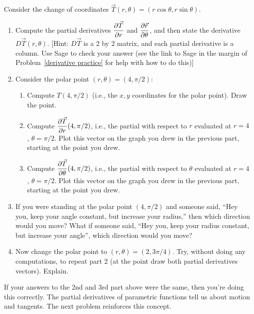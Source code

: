 \begin{problem}
 Consider the change of coordinates $\vec T(r,\theta) = (r\cos \theta, r\sin \theta)$.
\begin{enumerate}
 \item{}%
 Compute the partial derivatives $\displaystyle\frac{\partial \vec T}{\partial r}$ and $\displaystyle\frac{\partial \vec r}{\partial \theta}$, and then state the derivative $D\vec T(r,\theta)$. [Hint: $D\vec T$ is a 2 by 2 matrix, and each partial derivative is a column.  Use Sage to check your answer (see the link to Sage in the margin of Problem~\ref{derivative practice} for help with how to do this)]
 \item Consider the polar point $(r,\theta) = (4,\pi/2)$:
   \begin{enumerate}
   \item Compute $T(4,\pi/2)$ (i.e., the $x,y$ coordinates for the polar point).  Draw the point.
   \item Compute $\displaystyle \frac{\partial \vec T}{\partial r}(4,\pi/2)$, i.e., the partial with respect to $r$ evaluated at $r=4$, $\theta=\pi/2$.  Plot this vector on the graph you drew in the previous part, starting at the point you drew.
   \item Compute $\displaystyle \frac{\partial \vec T}{\partial \theta}(4,\pi/2)$, i.e., the partial with respect to $\theta$ evaluated at $r=4$, $\theta=\pi/2$.  Plot this vector on the graph you drew in the previous part, starting at the point you drew.
   \end{enumerate}
 \item If you were standing at the polar point $(4,\pi/2)$ and someone said, ``Hey you, keep your angle constant, but increase your radius,'' then which direction would you move?  What if someone said, ``Hey you, keep your radius constant, but increase your angle'', which direction would you move?
 \item Now change the polar point to $(r,\theta) = (2,3\pi/4)$.  Try, without doing  any computations, to repeat part 2 (at the point draw both partial derivatives vectors). Explain.
\end{enumerate}
\end{problem}

If your answers to the 2nd and 3rd part above were the same, then you're doing this correctly.  The partial derivatives of parametric functions tell us about motion and tangents. The next problem reinforces this concept.

